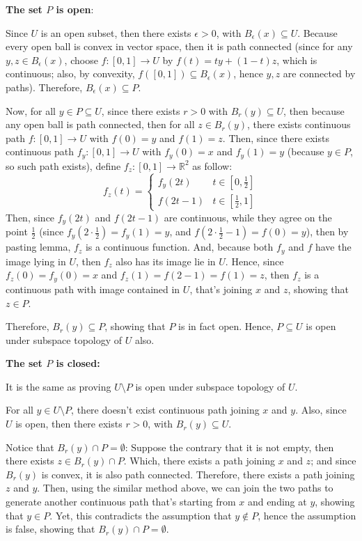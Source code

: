 \documentclass{article}
\begin{document}
\hfil

\textbf{The set $P$ is open}: 

Since $U$ is an open subset, then there exists $\epsilon>0$, with $B_\epsilon(x)\subseteq U$. Because every open ball is convex in vector space,
then it is path connected (since for any $y,z\in B_\epsilon(x)$, choose $f:[0,1]\rightarrow U$ by $f(t)=ty+(1-t)z$, which is continuous;
also, by convexity, $f([0,1])\subseteq B_\epsilon(x)$, hence $y,z$ are connected by paths). Therefore, $B_\epsilon(x)\subseteq P$.

Now, for all $y\in P\subseteq U$, since there exists $r>0$ with $B_r(y)\subseteq U$, then because any open ball is path connected, then for all $z\in B_r(y)$, there exists continuous path
$f:[0,1]\rightarrow U$ with $f(0)=y$ and $f(1)=z$.
Then, since there exists continuous path $f_y:[0,1]\rightarrow U$ with $f_y(0)=x$ and $f_y(1)=y$ (because $y\in P$, so such path exists), define $f_z:[0,1]\rightarrow \mathbb{R}^2$ as follow:
$$f_z(t)=\begin{cases}
    f_y\left(2t\right) & t\in [0,\frac{1}{2}]\\
    f\left(2t-1\right) & t\in [\frac{1}{2},1]
\end{cases}$$
Then, since $f_y(2t)$ and $f(2t-1)$ are continuous, while they agree on the point $\frac{1}{2}$ (since $f_y(2\cdot \frac{1}{2})=f_y(1)=y$, and $f(2\cdot\frac{1}{2}-1)=f(0)=y$),
then by pasting lemma, $f_z$ is a continuous function. And, because both $f_y$ and $f$ have the image lying in $U$, then $f_z$ also has its image lie in $U$. Hence, 
since $f_z(0)=f_y(0)=x$ and $f_z(1)=f(2-1)=f(1)=z$, then $f_z$ is a continuous path with image contained in $U$, that's joining $x$ and $z$, showing that $z\in P$.

Therefore, $B_r(y)\subseteq P$, showing that $P$ is in fact open. Hence, $P\subseteq U$ is open under subspace topology of $U$ also.

\hfil

\textbf{The set $P$ is closed:}

It is the same as proving $U\setminus P$ is open under subspace topology of $U$.

For all $y\in U\setminus P$, there doesn't exist continuous path joining $x$ and $y$. Also, since $U$ is open, then there exists $r>0$, with $B_r(y)\subseteq U$.

Notice that $B_r(y)\cap P = \emptyset$: Suppose the contrary that it is not empty, then there exists $z\in B_r(y)\cap P$.
Which, there exists a path joining $x$ and $z$; and since $B_r(y)$ is convex, it is also path connected. Therefore, there exists a path joining $z$ and $y$.
Then, using the similar method above, we can join the two paths to generate another continuous path that's starting from $x$ and ending at $y$, showing that $y\in P$.
Yet, this contradicts the assumption that $y\notin P$, hence the assumption is false, showing that $B_r(y)\cap P=\emptyset$.
\end{document}
